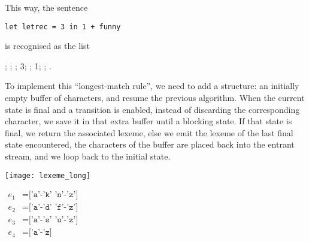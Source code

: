 \documentclass[12pt,a4paper]{article}
\begin{document}
This way, the sentence
\begin{center}
  \texttt{let letrec = 3 in 1 + funny}
\end{center}
is recognised as the list
\begin{center}
  \lbra\Tlet; \Tident {}; \Tequal;
  \Tint \num{3}; \Tin; \Tint \num{1}; \Tplus; \Tident {}\rbra.
\end{center}

To implement this ``longest\hyp{}match rule'', we need to add a
structure: an initially empty buffer of characters, and resume the
previous algorithm. When the current state is final and a transition
is enabled, instead of discarding the corresponding character, we save
it in that extra buffer until a blocking state. If that state is
final, we return the associated lexeme, else we emit the lexeme of the
last final state encountered, the characters of the buffer are placed
back into the entrant stream, and we loop back to the initial state.
\begin{center}
\begin{minipage}{0.45\linewidth}
\texttt{[image: lexeme\_long]}
\end{minipage}
\hspace*{15mm}
\begin{minipage}{0.4\linewidth}
$\begin{aligned}
  e_1 &= \texttt{['a'-'k' 'n'-'z']}\\
  e_2 &= \texttt{['a'-'d' 'f'-'z']}\\
  e_3 &= \texttt{['a'-'s' 'u'-'z']}\\
  e_4 &= \texttt{['a'-'z]}
\end{aligned}$
\end{minipage}
\end{center}



\nocite*{}
\end{document}
